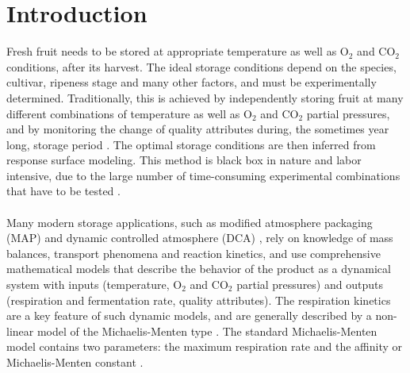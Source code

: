 \section{Introduction}
Fresh fruit needs to be stored at appropriate temperature as well as $\text{O}_2$ and $\text{CO}_2$ conditions, after its harvest. The ideal storage conditions depend on the species, cultivar, ripeness stage and many other factors, and must be experimentally determined. Traditionally, this is achieved by independently storing fruit at many different combinations of temperature as well as $\text{O}_2$ and $\text{CO}_2$ partial pressures, and by monitoring the change of quality attributes during, the sometimes year long, storage period \parencite{fidler}. The optimal storage conditions are then inferred from response surface modeling. This method is black box in nature and labor intensive, due to the large number of time-consuming experimental combinations that have to be tested \parencite{saltveit}.
\\
\\
Many modern {\color{red}storage} applications, such as modified atmosphere packaging (MAP) \parencite{MAP1,MAP2} and dynamic controlled atmosphere (DCA) \parencite{bessemans}, rely on knowledge of mass balances, transport phenomena and reaction kinetics, and use comprehensive mathematical models that describe the behavior of the product as a dynamical system with inputs (temperature, $\text{O}_2$ and $\text{CO}_2$ partial pressures) and outputs (respiration and fermentation rate, quality attributes). The respiration kinetics are a key feature of such dynamic models, and are generally described by a non-linear model of the Michaelis-Menten type \parencite{maarten1}. The standard Michaelis-Menten model contains two parameters: the maximum respiration rate and the affinity or Michaelis-Menten constant \parencite{peppelenbos}.
\\
\\
